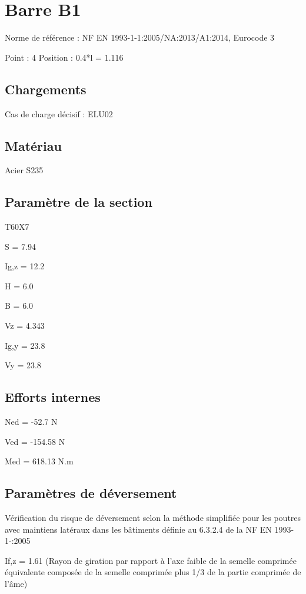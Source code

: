 \section{Barre B1}

Norme de référence : NF EN 1993-1-1:2005/NA:2013/A1:2014, Eurocode 3

Point : 4
Position : 0.4*l = 1.116

\subsection{Chargements}

Cas de charge décisif : ELU02

\subsection{Matériau}

Acier S235

\subsection{Paramètre de la section}

T60X7

S = 7.94

I{g,z} = 12.2

H = 6.0

B = 6.0

V{z} = 4.343

I{g,y} = 23.8

V{y} = 23.8

\subsection{Efforts internes}

N{ed} = -52.7 N

V{ed} = -154.58 N

M{ed} = 618.13 N.m


\subsection{Paramètres de déversement}

Vérification du risque de déversement selon la méthode simplifiée pour les poutres avec maintiens latéraux dans les bâtiments définie au 6.3.2.4 de la NF EN 1993-1-:2005

I{f,z} = 1.61 (Rayon de giration par rapport à l'axe faible de la semelle comprimée équivalente composée de la semelle comprimée plus 1/3 de la partie comprimée de l'âme)

